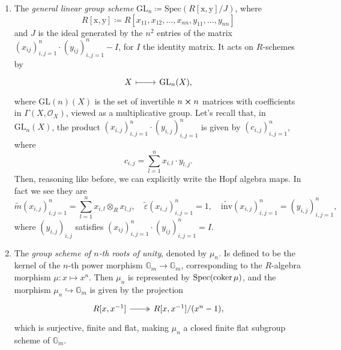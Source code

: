 \documentclass[../Main]{subfiles}
\begin{document}
\begin{ex}
\begin{enumerate}
		\item The {\em general linear group scheme} $\mathrm{GL}_n \coloneqq 
			\mathrm{Spec}(R[\mathrm{x},\mathrm{y}]/J)$,
			where
			\begin{equation*}
				R[\mathrm{x},\mathrm{y}] \coloneqq
				R[x_{11}, x_{12}, \ldots, x_{nn},
				y_{11}, \ldots, y_{nn}]
			\end{equation*} 
			and $J$ is the ideal generated by the $n^2$ entries of the matrix
			$\left( x_{ij} \right)_{i,j=1}^n \cdot \left( y_{ij} \right)_{i,j=1}^n - I$,
			for $I$ the identity matrix.
			It acts on $R$-schemes by
			\begin{equation*}
			\begin{tikzcd}[row sep = 0ex
				,/tikz/column 1/.append style={anchor=base east}
				,/tikz/column 2/.append style={anchor=base west}]
				X \arrow[r, "", mapsto] & \mathrm{GL}_n(X)
			,\end{tikzcd}
			\end{equation*} 
			where $\mathrm{GL}(n)(X)$ is the set of invertible $n \cross n$
			matrices with coefficients in $\Gamma \left( X , \mathcal{O}_{ X } \right)$,
			viewed as a multiplicative group.
			Let's recall that, in $\mathrm{GL}_n(X)$, the product
			$\left( x_{i,j} \right)_{i,j = 1}^n \cdot 
			\left( y_{i,j} \right)_{i,j = 1}^n$
			is given by $\left( c_{i,j} \right)_{i,j = 1}^n$, where
			\begin{equation*}
			c_{i,j} = \sum_{l=1}^{n} x_{i,l} \cdot y_{l,j}
			.\end{equation*} 
			Then, reasoning like before, we can explicitly write the Hopf algebra maps.
			In fact we see they are
			\begin{equation*}
				\widetilde{m}(x_{i,j})_{i,j=1}^n = \sum_{l=1}^{n} x_{i,l} \otimes_R x_{l,j},
				\quad
				\widetilde{\varepsilon}(x_{i,j})_{i,j=1}^n = 1,
				\quad
				\widetilde{\mathrm{inv}}(x_{i,j})_{i,j=1}^n = (y_{i,j})_{i,j=1}^n
			,\end{equation*} 
			where $\left( y_{i,j} \right)_{i,j}$ satisfies 
			$\left( x_{ij} \right)_{i,j=1}^n \cdot \left( y_{ij} \right)_{i,j=1}^n = I$.


		\item The {\em group scheme of $n$-th roots of unity}, denoted by $\mu_n$.
			Is defined to be the kernel of the $n$-th power morphism
			$\mathbb{G}_m \to \mathbb{G}_m$,
			corresponding to the $R$-algebra morphism
			$\mu\colon x \mapsto x^n$.
			Then $\mu_n$ is represented by $\mathrm{Spec}(\operatorname{coker} \mu)$,
			and the morphism $\mu_n \hookrightarrow \mathbb{G}_m$ is given by the projection
			\begin{equation*}
			\begin{tikzcd}
				R[x,x^{-1}] \arrow[r, "", twoheadrightarrow] &
				R[x,x^{-1}] / (x^n - 1)
			,\end{tikzcd}
			\end{equation*}
			which is surjective, finite and flat, making $\mu_n$
			a closed finite flat subgroup scheme of $\mathbb{G}_m$.



\end{enumerate}
\end{ex}
\end{document}
